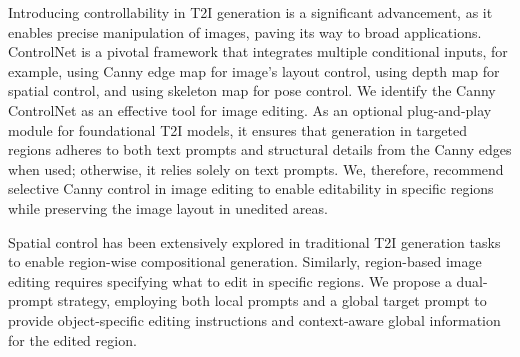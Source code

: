 \documentclass{article}
\newenvironment{cyanpar}{\color{cyan}}{}
\begin{document}
\begin{cyanpar}

Introducing controllability in T2I generation is a significant advancement, as it enables precise manipulation of images, paving its way to broad applications. ControlNet \citep{zhang2023adding} is a pivotal framework that integrates multiple conditional inputs, for example, using Canny edge map for image's layout control, using depth map for spatial control, and using skeleton map for pose control. We identify the Canny ControlNet as an effective tool for image editing. As an optional plug-and-play module for foundational T2I models, it ensures that generation in targeted regions adheres to both text prompts and structural details from the Canny edges when used; otherwise, it relies solely on text prompts. We, therefore, recommend selective Canny control in image editing to enable editability in specific regions while preserving the image layout in unedited areas.

Spatial control has been extensively explored in traditional T2I generation tasks \citep{li2023gligen,chen2024training,yang2024mastering,feng2024ranni,wu2024self,ma2024hico,zhang2024creatilayout,chen2024region} to enable region-wise compositional generation. Similarly, region-based image editing requires specifying what to edit in specific regions. We propose a dual-prompt strategy, employing both local prompts and a global target prompt to provide object-specific editing instructions and context-aware global information for the edited region.



\end{cyanpar}





 
\end{document}
